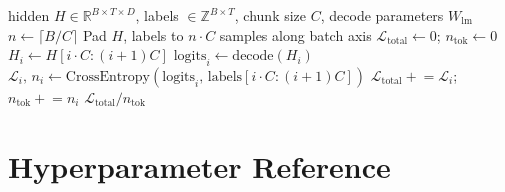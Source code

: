 \documentclass[11pt]{article}
\begin{document}
\begin{algorithm}[ht]
\caption{Chunked Cross-Entropy Loss}
\label{alg:chunked_loss}
\begin{algorithmic}[1]
\Require hidden $H \in \mathbb{R}^{B \times T \times D}$,
         labels $\in \mathbb{Z}^{B \times T}$,
         chunk size $C$, decode parameters $W_{\mathrm{lm}}$
\State $n \leftarrow \lceil B / C \rceil$
\State Pad $H$, labels to $n \cdot C$ samples along batch axis
\State $\mathcal{L}_{\mathrm{total}} \leftarrow 0$;\;\;
       $n_{\mathrm{tok}} \leftarrow 0$
  \State $H_i \leftarrow H[i \cdot C : (i{+}1)C]$
  \State $\mathrm{logits}_i \leftarrow \mathrm{decode}(H_i)$
  \State $\mathcal{L}_i,\, n_i \leftarrow
    \mathrm{CrossEntropy}(\mathrm{logits}_i,\, \mathrm{labels}[i{\cdot}C : (i{+}1)C])$
  \State $\mathcal{L}_{\mathrm{total}} \mathrel{+}= \mathcal{L}_i$;\;\;
         $n_{\mathrm{tok}} \mathrel{+}= n_i$
\EndFor
\State \Return $\mathcal{L}_{\mathrm{total}} / n_{\mathrm{tok}}$
\end{algorithmic}
\end{algorithm}

\section{Hyperparameter Reference}
\label{app:hparams}
\end{document}
